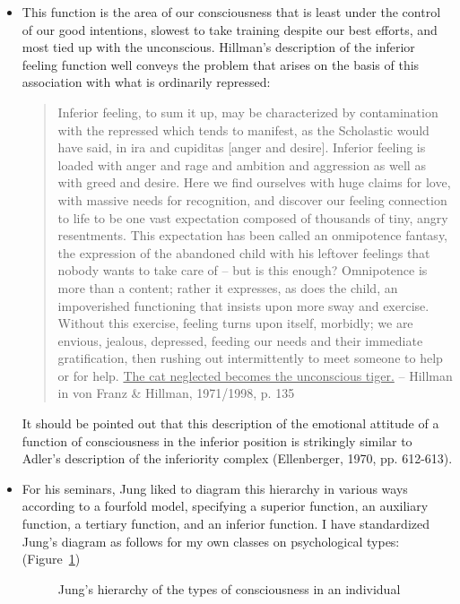 \begin{itemize}
\item This function is the area of our consciousness that is least under the
control of our good intentions, slowest to take training despite our best
efforts, and most tied up with the unconscious. Hillman's description of the
inferior feeling function well conveys the problem that arises on the basis of
this association with what is ordinarily repressed:

\begin{quote}

Inferior feeling, to sum it up, may be characterized by contamination with the
repressed which tends to manifest, as the Scholastic would have said, in ira
and cupiditas [anger and desire]. Inferior feeling is loaded with anger and
rage and ambition and aggression as well as with greed and desire. Here we find
ourselves with huge claims for love, with massive needs for recognition, and
discover our feeling connection to life to be one vast expectation composed of
thousands of tiny, angry resentments. This expectation has been called an
onmipotence fantasy, the expression of the abandoned child with his leftover
feelings that nobody wants to take care of -- but is this enough? Omnipotence
is more than a content; rather it expresses, as does the child, an impoverished
functioning that insists upon more sway and exercise. Without this exercise,
feeling turns upon itself, morbidly; we are envious, jealous, depressed,
feeding our needs and their immediate gratification, then rushing out
intermittently to meet someone to help or for help. \ul{The cat neglected
becomes the unconscious tiger.} \flushright -- Hillman in von Franz \& Hillman,
1971/1998, p. 135

\end{quote}

It should be pointed out that this description of the emotional attitude of a
function of consciousness in the inferior position is strikingly similar to
Adler's description of the inferiority complex (Ellenberger, 1970, pp.
612-613).

\item For his seminars, Jung liked to diagram this hierarchy in various ways
according to a fourfold model, specifying a superior function, an auxiliary
function, a tertiary function, and an inferior function. I have standardized
Jung's diagram as follows for my own classes on psychological types:
(Figure~\ref{fig:beebe-figure-31})

\begin{figure}[h!]
  \centering
\caption{Jung’s hierarchy of the types of consciousness in an individual}
\label{fig:beebe-figure-31}
\end{figure}


\end{itemize}
